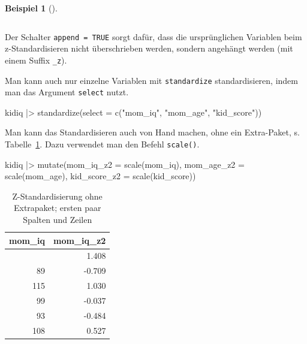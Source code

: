 \documentclass[
  ngerman,
  letterpaper,
  twoside,
  open=any]{scrbook}
\newenvironment{Shaded}{\begin{snugshade}}{\end{snugshade}}
\newcommand{\AttributeTok}[1]{\textcolor[rgb]{0.40,0.45,0.13}{#1}}
\newcommand{\FunctionTok}[1]{\textcolor[rgb]{0.28,0.35,0.67}{#1}}
\newcommand{\NormalTok}[1]{\textcolor[rgb]{0.00,0.23,0.31}{#1}}
\newcommand{\SpecialCharTok}[1]{\textcolor[rgb]{0.37,0.37,0.37}{#1}}
\newcommand{\StringTok}[1]{\textcolor[rgb]{0.13,0.47,0.30}{#1}}
\theoremstyle{definition}
\newtheorem{example}{Beispiel}[chapter]
\theoremstyle{plain}
\theoremstyle{definition}
\theoremstyle{definition}
\theoremstyle{remark}
\begin{document}
\begin{example}[]
{\begin{longtable}[]{@{}rrlr@{}}
\end{longtable}

}

Der Schalter \texttt{append\ =\ TRUE} sorgt dafür, dass die
ursprünglichen Variablen beim z-Standardisieren nicht überschrieben
werden, sondern angehängt werden (mit einem Suffix \texttt{\_z}).

Man kann auch nur einzelne Variablen mit \texttt{standardize}
standardisieren, indem man das Argument \texttt{select} nutzt.

\begin{Shaded}
\begin{Highlighting}[]
\NormalTok{kidiq }\SpecialCharTok{|\textgreater{}} 
  \FunctionTok{standardize}\NormalTok{(}\AttributeTok{select =} \FunctionTok{c}\NormalTok{(}\StringTok{"mom\_iq"}\NormalTok{, }\StringTok{"mom\_age"}\NormalTok{, }\StringTok{"kid\_score"}\NormalTok{))}
\end{Highlighting}
\end{Shaded}

Man kann das Standardisieren auch von Hand machen, ohne ein Extra-Paket,
s. Tabelle~\ref{tbl-scale-manual}. Dazu verwendet man den Befehl
\texttt{scale()}.

\begin{Shaded}
\begin{Highlighting}[]
\NormalTok{kidiq }\SpecialCharTok{|\textgreater{}} 
  \FunctionTok{mutate}\NormalTok{(}\AttributeTok{mom\_iq\_z2 =} \FunctionTok{scale}\NormalTok{(mom\_iq),}
         \AttributeTok{mom\_age\_z2 =} \FunctionTok{scale}\NormalTok{(mom\_age),}
         \AttributeTok{kid\_score\_z2 =} \FunctionTok{scale}\NormalTok{(kid\_score))}
\end{Highlighting}
\end{Shaded}

{

\begin{longtable}[]{@{}rr@{}}

\caption{\label{tbl-scale-manual}Z-Standardisierung ohne Extrapaket;
ersten paar Spalten und Zeilen}

\tabularnewline

\toprule\noalign{}
mom\_iq & mom\_iq\_z2 \\
\midrule\noalign{}
\endhead
\bottomrule\noalign{}
\endlastfoot
121 & 1.408 \\
89 & -0.709 \\
115 & 1.030 \\
99 & -0.037 \\
93 & -0.484 \\
108 & 0.527 \\


\end{longtable}}
\end{example}
\end{document}
